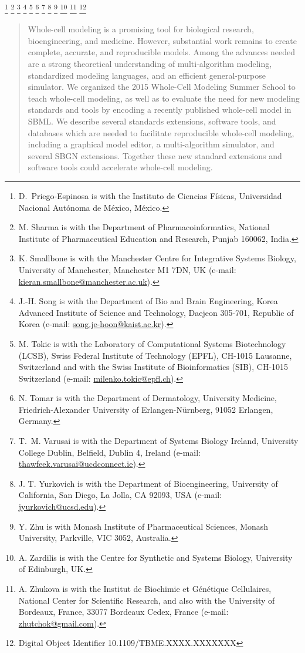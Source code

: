\documentclass[journal,transmag]{IEEEtran}
\newcommand{\email}[1]{\href{mailto:#1}{#1}}
\begin{document}
{    \thanks{D.~Priego-Espinosa is with the Instituto de Ciencias F{\'i}sicas, Universidad Nacional Aut{\'o}noma de M{\'e}xico, M{\'e}xico.}
    \thanks{M. Sharma is with the Department of Pharmacoinformatics, National Institute of Pharmaceutical Education and Research, Punjab 160062, India.}
    \thanks{K. Smallbone is with the Manchester Centre for Integrative Systems Biology, University of Manchester, Manchester M1 7DN, UK (e-mail: \email{kieran.smallbone@manchester.ac.uk}).}
    \thanks{J.-H. Song is with the Department of Bio and Brain Engineering, Korea Advanced Institute of Science and Technology, Daejeon 305-701, Republic of Korea (e-mail: \email{song.je-hoon@kaist.ac.kr}).}
    \thanks{M. Tokic is with the Laboratory of Computational Systems Biotechnology (LCSB), Swiss Federal Institute of Technology (EPFL), CH-1015 Lausanne, Switzerland and with the Swiss Institute of Bioinformatics (SIB), CH-1015 Switzerland (e-mail: \email{milenko.tokic@epfl.ch}).}
    \thanks{N. Tomar is with the Department of Dermatology, University Medicine, Friedrich-Alexander University of Erlangen-N\"urnberg, 91052 Erlangen, Germany.}
   \thanks{T.~M. Varusai is with the Department of Systems Biology Ireland, University College Dublin, Belfield, Dublin 4, Ireland (e-mail: \email{thawfeek.varusai@ucdconnect.ie}).}
    \thanks{J. T. Yurkovich is with the Department of Bioengineering, University of California, San Diego, La Jolla, CA 92093, USA (e-mail: \email{jyurkovich@ucsd.edu}).}
    \thanks{Y. Zhu is with Monash Institute of Pharmaceutical Sciences, Monash University, Parkville, VIC 3052, Australia.}
    \thanks{A. Zardilis is with the Centre for Synthetic and Systems Biology, University of Edinburgh, UK.} 
    \thanks{A. Zhukova is with the Institut de Biochimie et G\'en\'etique Cellulaires, National Center for Scientific Research, and also with the University of Bordeaux, France, 33077 Bordeaux Cedex, France (e-mail: \email{zhutchok@gmail.com}).}
    \thanks{Digital Object Identifier 10.1109/TBME.XXXX.XXXXXXX}
}

\maketitle

\begin{abstract}
Whole-cell modeling is a promising tool for biological research, bioengineering, and medicine. 
However, substantial work remains to create complete, accurate, and reproducible models.
Among the advances needed are a strong theoretical understanding of multi-algorithm modeling, standardized modeling languages, and an efficient general-purpose simulator.
We organized the 2015 Whole-Cell Modeling Summer School to teach whole-cell modeling, as well as to evaluate the need for new modeling standards and tools by encoding a recently published whole-cell model in SBML.
We describe several standards extensions, software tools, and databases which are needed to facilitate reproducible whole-cell modeling, including a graphical model editor, a multi-algorithm simulator, and several SBGN extensions.
Together these new standard extensions and software tools could accelerate whole-cell modeling.
\end{abstract}
\end{document}
